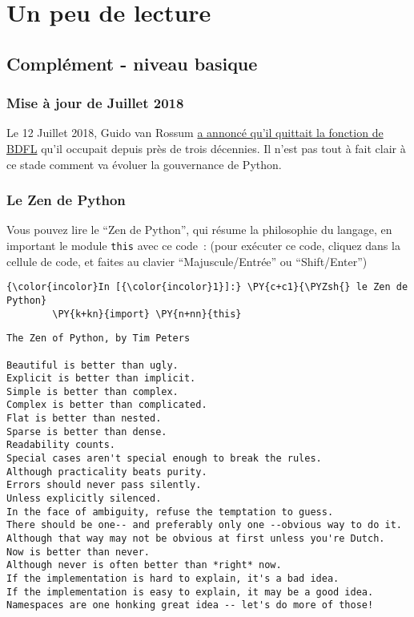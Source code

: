 
    \hypertarget{un-peu-de-lecture}{%
\section{Un peu de lecture}\label{un-peu-de-lecture}}

    \hypertarget{compluxe9ment---niveau-basique}{%
\subsection{Complément - niveau
basique}\label{compluxe9ment---niveau-basique}}

    \hypertarget{mise-uxe0-jour-de-juillet-2018}{%
\subsubsection{Mise à jour de Juillet
2018}\label{mise-uxe0-jour-de-juillet-2018}}

    Le 12 Juillet 2018, Guido van Rossum
\href{https://lwn.net/Articles/759654/}{a annoncé qu'il quittait la
fonction de BDFL} qu'il occupait depuis près de trois décennies. Il
n'est pas tout à fait clair à ce stade comment va évoluer la gouvernance
de Python.

    \hypertarget{le-zen-de-python}{%
\subsubsection{Le Zen de Python}\label{le-zen-de-python}}

    Vous pouvez lire le ``Zen de Python'', qui résume la philosophie du
langage, en important le module \texttt{this} avec ce code~: (pour
exécuter ce code, cliquez dans la cellule de code, et faites au clavier
``Majuscule/Entrée'' ou ``Shift/Enter'')

    \begin{Verbatim}[commandchars=\\\{\}]
{\color{incolor}In [{\color{incolor}1}]:} \PY{c+c1}{\PYZsh{} le Zen de Python}
        \PY{k+kn}{import} \PY{n+nn}{this}
\end{Verbatim}


    \begin{Verbatim}[commandchars=\\\{\}]
The Zen of Python, by Tim Peters

Beautiful is better than ugly.
Explicit is better than implicit.
Simple is better than complex.
Complex is better than complicated.
Flat is better than nested.
Sparse is better than dense.
Readability counts.
Special cases aren't special enough to break the rules.
Although practicality beats purity.
Errors should never pass silently.
Unless explicitly silenced.
In the face of ambiguity, refuse the temptation to guess.
There should be one-- and preferably only one --obvious way to do it.
Although that way may not be obvious at first unless you're Dutch.
Now is better than never.
Although never is often better than *right* now.
If the implementation is hard to explain, it's a bad idea.
If the implementation is easy to explain, it may be a good idea.
Namespaces are one honking great idea -- let's do more of those!

    \end{Verbatim}

